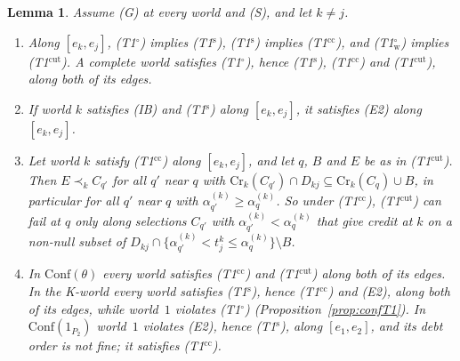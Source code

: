 \documentclass[11pt]{article}
\newtheorem{lemma}[theorem]{Lemma}
\theoremstyle{definition}\newtheorem{definition}[theorem]{Definition}
\theoremstyle{remark}\newtheorem{remark}[theorem]{Remark}
\newcommand{\Tw}{\textup{(T1$^\circ_{\mathrm w}$)}}
\newcommand{\To}{\textup{(T1$^\circ$)}}
\newcommand{\Ts}{\textup{(T1$^{\mathrm s}$)}}
\newcommand{\Tcc}{\textup{(T1$^{\mathrm{cc}}$)}}
\newcommand{\Tcut}{\textup{(T1$^{\mathrm{cut}}$)}}
\begin{document}
\begin{lemma}\label{lem:Tsrel}
Assume (G) at every world and (S), and let $k\ne j$.
\begin{enumerate}[label=(\alph*),leftmargin=*,itemsep=2pt]
\item Along $[e_k,e_j]$, \To{} implies \Ts{}, \Ts{} implies \Tcc{}, and
\Tw{} implies \Tcut{}. A complete world satisfies \To, hence \Ts, \Tcc{}
and \Tcut, along both of its edges.
\item If world $k$ satisfies (IB) and \Ts{} along $[e_k,e_j]$, it satisfies
(E2) along $[e_k,e_j]$.
\item Let world $k$ satisfy \Tcc{} along $[e_k,e_j]$, and let $q$, $B$ and
$E$ be as in \Tcut. Then $E\prec_kC_{q'}$ for all $q'$ near $q$ with
$\mathrm{Cr}_k(C_{q'})\cap D_{kj}\subseteq\mathrm{Cr}_k(C_q)\cup B$, in
particular for all $q'$ near $q$ with $\alpha^{(k)}_{q'}\ge
\alpha^{(k)}_q$. So under \Tcc{}, \Tcut{} can fail at $q$ only along
selections $C_{q'}$ with $\alpha^{(k)}_{q'}<\alpha^{(k)}_q$ that give credit
at $k$ on a non-null subset of $D_{kj}\cap\{\alpha^{(k)}_{q'}<t^k_j\le
\alpha^{(k)}_q\}\setminus B$.
\item In $\mathrm{Conf}(\theta)$ every world satisfies \Tcc{} and \Tcut{}
along both of its edges. In the K-world every world satisfies \Ts{}, hence \Tcc{} and
(E2), along both of its edges, while world~$1$ violates \To{}
(Proposition~\ref{prop:confT1}). In $\mathrm{Conf}(1_{P_2})$ world~$1$
violates (E2), hence \Ts{}, along $[e_1,e_2]$, and its debt order is not
fine; it satisfies \Tcc.
\end{enumerate}
\end{lemma}
\end{document}
